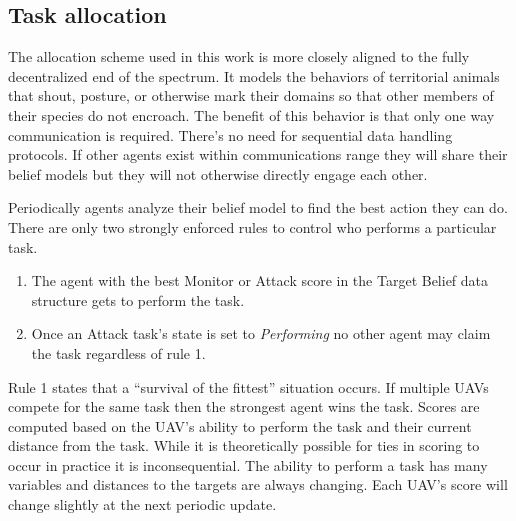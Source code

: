 
\subsection{Task allocation}
\label{sec:uncoordTaskingMyWork}


The allocation scheme used in this work is more closely aligned to the fully decentralized end of the spectrum.  It models the behaviors of territorial animals that shout, posture, or otherwise mark their domains so that other members of their species do not encroach.  The benefit of this behavior is that only one way communication is required.  There's no need for sequential data handling protocols.  If other agents exist within communications range they will share their belief models but they will not otherwise directly engage each other.  

Periodically agents analyze their belief model to find the best action they can do.  There are only two strongly enforced rules to control who performs a particular task.  

\begin{enumerate}
	\item The agent with the best Monitor or Attack score in the Target Belief data structure gets to perform the task.
	\item Once an Attack task's state is set to \textit{Performing} no other agent may claim the task regardless of rule 1.
\end{enumerate}

Rule 1 states that a ``survival of the fittest'' situation occurs.  If multiple UAVs compete for the same task then the strongest agent wins the task.  Scores are computed based on the UAV's ability to perform the task and their current distance from the task.  While it is theoretically possible for ties in scoring to occur in practice it is inconsequential.  The ability to perform a task has many variables and distances to the targets are always changing.  Each UAV's score will change slightly at the next periodic update.

